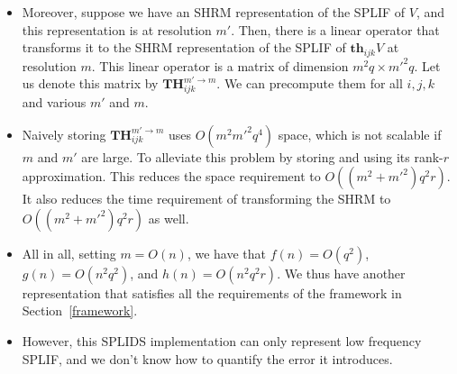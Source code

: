 \documentclass[10pt]{article}
\newcommand{\Th}{\mathbf{th}}
\begin{document}
\begin{itemize}
    \item Moreover, suppose we have an SHRM representation
        of the SPLIF of $V$, and this representation is at
        resolution $m'$. Then, there is a linear 
        operator that transforms it to the SHRM representation 
        of the SPLIF of $\Th_{ijk} V$ at resolution $m$.
        This linear operator is a matrix of dimension 
        $m^2 q \times m'^2 q$. Let us denote this matrix
        by $\mathbf{TH}_{ijk}^{m' \rightarrow m}$. 
        We can precompute them for all $i,j,k$ and various
        $m'$ and $m$.
        
    \item Naively storing $\mathbf{TH}_{ijk}^{m' \rightarrow m}$
         uses $O(m^2 m'^2 q^4)$ space, which is not scalable
         if $m$ and $m'$ are large. To alleviate this problem
         by storing and using its rank-$r$ approximation. 
         This reduces the space requirement to $O((m^2 + m'^2)q^2 r)$.
         It also reduces the time requirement of 
         transforming the SHRM to $O((m^2 + m'^2)q^2 r)$ as well.
         
    \item All in all, setting $m = O(n)$, 
        we have that $f(n) = O(q^2)$, $g(n) = O(n^2 q^2)$,
        and $h(n) = O(n^2 q^2 r)$. We thus have another
        representation that satisfies all the requirements
        of the framework in Section~\ref{framework}.
        
    \item However, this SPLIDS implementation can only represent low frequency SPLIF, and we don’t know
how to quantify the error it introduces.
\end{itemize}


{}

\end{document}
